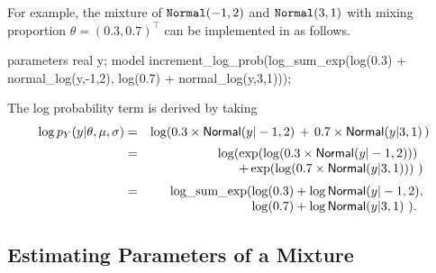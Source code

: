 For example, the mixture of $\code{Normal}(-1,2)$ and
$\code{Normal}(3,1)$ with mixing proportion $\theta =
(0.3,0.7)^{\top}$ can be implemented in \Stan as follows.
%
\begin{stancode}
parameters {
  real y;
}
model {
  increment_log_prob(log_sum_exp(log(0.3) 
                                   + normal_log(y,-1,2),
                                 log(0.7) 
                                   + normal_log(y,3,1)));
}
\end{stancode}
%
The log probability term is derived by taking
%
\begin{eqnarray*}
\log p_Y(y | \theta,\mu,\sigma) & = & \log\!\left( 0.3 \times \distro{Normal}(y|-1,2) \, + \,
  0.7 \times
  \distro{Normal}(y|3,1) \, \right)
\\[2pt]
& = & \log(\hspace*{-5pt} \begin{array}[t]{l}
                 \exp(\log(0.3 \times \distro{Normal}(y|-1,2))) \\
                 + \exp(\log(0.7 \times \distro{Normal}(y|3,1))) \ )
              \end{array}
\\[2pt]
& = & \mbox{log\_sum\_exp}(\hspace*{-5pt}\begin{array}[t]{l}
                         \log(0.3) + \log \distro{Normal}(y|-1,2),
                         \\                  
                         \log(0.7) + \log \distro{Normal}(y|3,1) \ ).
                       \end{array}
\end{eqnarray*}
%

\subsection{Estimating Parameters of a Mixture}

